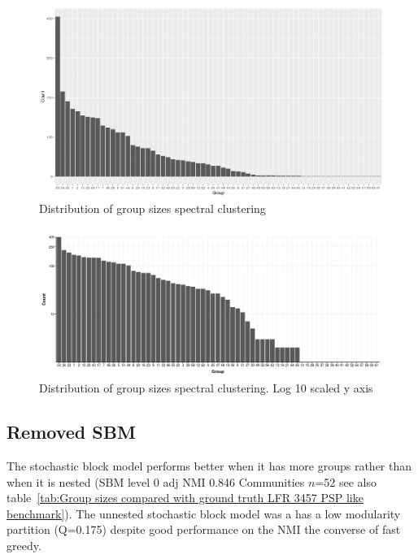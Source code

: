 \begin{figure}
    \centering
    \includegraphics[width=\textwidth]{images/Rplot_group_size_spectral.png}
    \caption{Distribution of group sizes spectral clustering}
    \label{fig:group sizes spectral clustering shows power law distribution}
\end{figure}


\begin{figure}
    \centering
    \includegraphics[width=\textwidth]{images/chapter_community_detection/ggplot2/group_size/Rplot_log10_spectral.png}
    \caption{Distribution of group sizes spectral clustering. Log 10 scaled y axis}
    \label{fig:group sizes spectral clustering log 10}
\end{figure}

\subsection{Removed SBM}
The stochastic block model performs better when it has more groups rather than when it is nested (SBM level 0 adj NMI 0.846 Communities $n$=52 see also table~\ref{tab:Group sizes compared with ground truth LFR 3457 PSP like benchmark}). The unnested stochastic block model was a has a low modularity partition (Q=0.175) despite good performance on the NMI the converse of fast greedy.


